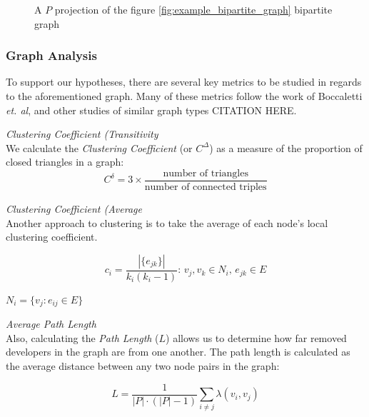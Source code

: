 \documentclass{proc}
\begin{document}
\begin{figure}
\label{fig:example_bipartite_projection_graph}
\centering
{}
\caption{A $P$ projection of the figure \ref{fig:example_bipartite_graph} bipartite graph}
\end{figure}

\subsubsection{Graph Analysis}
To support our hypotheses, there are several key metrics to be studied in regards to the aforementioned graph. Many of these metrics follow the work of Boccaletti \textit{et. al}\cite{boccaletti2006complex}, and other studies of similar graph types CITATION HERE.

\textit{Clustering Coefficient (Transitivity}\\
We calculate the \textit{Clustering Coefficient} (or $C^\Delta$) as a measure of the proportion of closed triangles in a graph\cite{newman2003structure}:
\[C^\delta = 3 \times \frac{\text{number of triangles}}
                    {\text{number of connected triples}}\]

\textit{Clustering Coefficient (Average}\\
Another approach to clustering is to take the average of each node's local clustering coefficient\cite{watts1998collective}.

\[ c_i = \frac{|\{e_{jk}\}|}{k_i(k_i-1)} :\, v_j,v_k \in N_i,\, e_{jk} \in E \]

{$N_i = \{v_j : e_{ij} \in E\}$}

\textit{Average Path Length}\\
Also, calculating the \textit{Path Length} ($L$) allows us to determine how far removed developers in the graph are from one another. The path length is calculated as the average distance between any two node pairs in the graph:

\[L = \frac{1}{|P| \cdot (|P|-1)} \sum_{i \neq j}\lambda(v_i,v_j)\]
\end{document}
